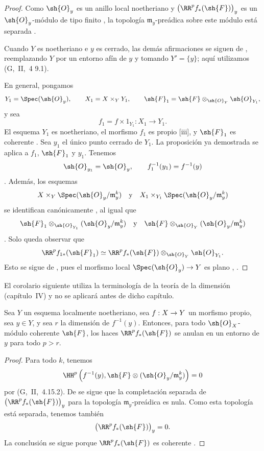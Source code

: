 \documentclass[oneside]{amsart}
\makeatletter
\newcommand{\ega@arrow}[2]{\mathchoice{#1}{#2}{#2}{#2}}
\renewcommand{\to}{\ega@arrow{\longrightarrow}{\rightarrow}}
\let\EGAOriginalLabel\label
\renewcommand{\label}[1]{\phantomsection\EGAOriginalLabel{#1}}
\makeatother
\begin{document}
\begin{proof}
Como $\sh{O}_y$ es un anillo local noetheriano y
$\bigl(\RR^p f_*(\sh{F})\bigr)_y$ es un $\sh{O}_y$-módulo de tipo
finito , la topología $\mathfrak{m}_y$-preádica sobre
este módulo está separada .

Cuando $Y$ es noetheriano e $y$ es cerrado, las demás afirmaciones se
siguen de , reemplazando $Y$ por un entorno afín de
$y$ y tomando $Y'=\{y\}$; aquí utilizamos (G,~II,~4 9.1).

En general, pongamos
\[
  Y_1=\Spec(\sh{O}_y),
  \qquad
  X_1=X\times_Y Y_1,
  \qquad
  \sh{F}_1
  =
  \sh{F}\otimes_{\sh{O}_Y}\sh{O}_{Y_1},
\]
y sea
\[
  f_1=f\times 1_{Y_1}:X_1\longrightarrow Y_1.
\]
El esquema $Y_1$ es noetheriano, el morfismo $f_1$ es propio
[iii], y $\sh{F}_1$ es coherente
.
Sea $y_1$ el único punto cerrado de $Y_1$.
La proposición ya demostrada se aplica a $f_1$, $\sh{F}_1$ y
$y_1$.
Tenemos
\[
  \sh{O}_{y_1}=\sh{O}_y,
  \qquad
  f_1^{-1}(y_1)=f^{-1}(y)
\]
.
Además, los esquemas
\[
  X\times_Y\Spec(\sh{O}_y/\mathfrak{m}_y^k)
  \quad\text{y}\quad
  X_1\times_{Y_1}\Spec(\sh{O}_y/\mathfrak{m}_y^k)
\]
se identifican canónicamente , al igual que
\[
  \sh{F}_1
  \otimes_{\sh{O}_{Y_1}}
  (\sh{O}_y/\mathfrak{m}_y^k)
  \quad\text{y}\quad
  \sh{F}
  \otimes_{\sh{O}_Y}
  (\sh{O}_y/\mathfrak{m}_y^k)
\]
.
Solo queda observar que
\[
  \RR^p f_{1*}(\sh{F}_1)
  \simeq
  \RR^p f_*(\sh{F})
  \otimes_{\sh{O}_Y}
  \sh{O}_{Y_1}.
\]
Esto se sigue de , pues el morfismo local
$\Spec(\sh{O}_y)\to Y$ es plano
, .
\end{proof}

El corolario siguiente utiliza la terminología de la teoría de la
dimensión (capítulo~IV) y no se aplicará antes de dicho capítulo.

\begin{corollary}[4.2.2]
\label{III.4.2.2}
Sea $Y$ un esquema localmente noetheriano, sea $f:X\to Y$ un
morfismo propio, sea $y\in Y$, y sea $r$ la dimensión de
$f^{-1}(y)$.
Entonces, para todo $\sh{O}_X$-módulo coherente $\sh{F}$, los haces
$\RR^p f_*(\sh{F})$ se anulan en un entorno de $y$ para todo
$p>r$.
\end{corollary}

\begin{proof}
Para todo $k$, tenemos
\[
  \HH^p\left(
    f^{-1}(y),
    \sh{F}\otimes
    (\sh{O}_y/\mathfrak{m}_y^k)
  \right)
  =
  0
\]
por (G,~II,~4.15.2).
De  se sigue que la completación separada de
$\bigl(\RR^p f_*(\sh{F})\bigr)_y$ para la topología
$\mathfrak{m}_y$-preádica es nula.
Como esta topología está separada, tenemos también
\[
  \bigl(\RR^p f_*(\sh{F})\bigr)_y=0.
\]
La conclusión se sigue porque $\RR^p f_*(\sh{F})$ es coherente
.
\end{proof}
\end{document}
